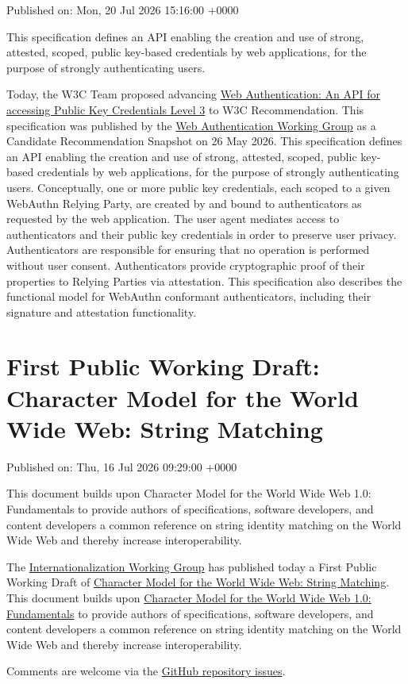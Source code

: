 \documentclass[11pt,a4paper]{article}
\begin{document}
Published on: Mon, 20 Jul 2026 15:16:00 +0000

This specification defines an API enabling the creation and use of strong, attested, scoped, public key-based credentials by web applications, for the purpose of strongly authenticating users.

Today, the W3C Team proposed advancing \href{https://www.w3.org/TR/2026/CR-webauthn-3-20260526/}{Web Authentication: An API for accessing Public Key Credentials Level 3} to W3C Recommendation. This specification was published by the \href{https://www.w3.org/groups/wg/webauthn/}{Web Authentication Working Group} as a Candidate Recommendation Snapshot on 26 May 2026. This specification defines an API enabling the creation and use of strong, attested, scoped, public key-based credentials by web applications, for the purpose of strongly authenticating users. Conceptually, one or more public key credentials, each scoped to a given WebAuthn Relying Party, are created by and bound to authenticators as requested by the web application. The user agent mediates access to authenticators and their public key credentials in order to preserve user privacy. Authenticators are responsible for ensuring that no operation is performed without user consent. Authenticators provide cryptographic proof of their properties to Relying Parties via attestation. This specification also describes the functional model for WebAuthn conformant authenticators, including their signature and attestation functionality.

\section{First Public Working Draft: Character Model for the World Wide Web: String Matching}

Published on: Thu, 16 Jul 2026 09:29:00 +0000

This document builds upon Character Model for the World Wide Web 1.0: Fundamentals to provide authors of specifications, software developers, and content developers a common reference on string identity matching on the World Wide Web and thereby increase interoperability.

The \href{https://www.w3.org/groups/wg/i18n-core/}{Internationalization Working Group} has published today a First Public Working Draft of \href{https://www.w3.org/TR/2026/WD-charmod-norm-20260716/}{Character Model for the World Wide Web: String Matching}. This document builds upon \href{https://www.w3.org/TR/charmod/}{Character Model for the World Wide Web 1.0: Fundamentals} to provide authors of specifications, software developers, and content developers a common reference on string identity matching on the World Wide Web and thereby increase interoperability.

Comments are welcome via the \href{https://github.com/w3c/charmod-norm/}{GitHub repository issues}.
\end{document}
